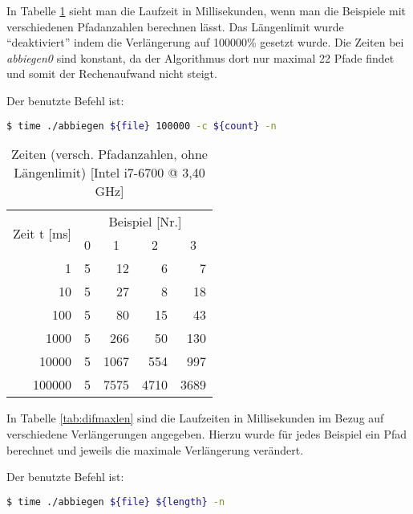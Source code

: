 \documentclass[a4paper,10pt,ngerman]{scrartcl}
\begin{document}
In Tabelle \ref{tab:difpathcount} sieht man die Laufzeit in Millisekunden, wenn man die Beispiele mit verschiedenen Pfadanzahlen berechnen lässt.
Das Längenlimit wurde ``deaktiviert''  indem die Verlängerung auf 100000\% gesetzt wurde.
Die Zeiten bei \textit{abbiegen0} sind konstant, da der Algorithmus dort nur maximal 22 Pfade findet und somit der Rechenaufwand nicht steigt.

Der benutzte Befehl ist:
\begin{lstlisting}[language=bash, numbers=none]
$ time ./abbiegen ${file} 100000 -c ${count} -n
\end{lstlisting}

\begin{table}[ht]
  \centering
  \begin{tabular}{c|r|r|r|r|r|}
    \multicolumn{2}{c|}{\multirow{2}{*}{Zeit t [ms]}} & \multicolumn{4}{|c|}{Beispiel [Nr.]} \\
    \cline{3-6}
    \multicolumn{2}{c|}{} & \multicolumn{1}{|c|}{0} & \multicolumn{1}{|c|}{1} & \multicolumn{1}{|c|}{2} & \multicolumn{1}{|c|}{3} \\
    \hline
    \parbox[t]{3mm}{}
    & 1      & 5 &   12 &    6 &    7 \\
    & 10     & 5 &   27 &    8 &   18 \\
    & 100    & 5 &   80 &   15 &   43 \\
    & 1000   & 5 &  266 &   50 &  130 \\
    & 10000  & 5 & 1067 &  554 &  997 \\
    & 100000 & 5 & 7575 & 4710 & 3689 \\
    \hline
  \end{tabular}
  \caption{Zeiten (versch. Pfadanzahlen, ohne Längenlimit) [Intel i7-6700 @ 3,40 GHz]}
  \label{tab:difpathcount}
\end{table}

In Tabelle \ref{tab:difmaxlen} sind die Laufzeiten in Millisekunden im Bezug auf verschiedene Verlängerungen angegeben. Hierzu wurde für jedes Beispiel ein Pfad berechnet
und jeweils die maximale Verlängerung verändert.

Der benutzte Befehl ist:
\begin{lstlisting}[language=bash, numbers=none]
$ time ./abbiegen ${file} ${length} -n
\end{lstlisting}
\end{document}
